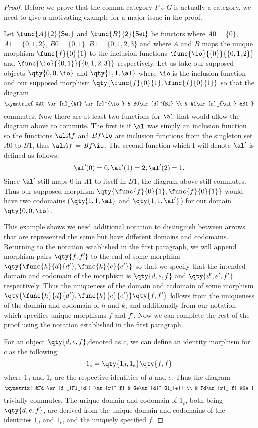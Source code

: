 \documentclass[../../main]{subfiles}
\begin{document}
\begin{proof}
	Before we prove that the comma category $F\downarrow G$ is actually a
	category, we need to give a motivating example for a major issue in the
	proof.

	Let \(\func{A}{\mathsf{2}}{\mathsf{Set}}\) and
	\(\func{B}{\mathsf{2}}{\mathsf{Set}}\) be functors where $A0 = \{0\}$, $A1 =
	\{0,1,2\}$, $B0 = \{0,1\}$, $B1 = \{0,1,2,3\}$ and where $A$ and $B$ maps
	the unique morphism \(\func{f}{0}{1}\) to the inclusion functions
	\(\func{\io}{\{0\}}{\{0,1,2\}}\)  and \(\func{\io}{\{0,1\}}{\{0,1,2,3\}}\)
	respectively. Let us take our supposed objects $\qty{0,0,\io}$  and
	$\qty{1,1,\al}$ where $\io$ is the inclusion function and our supposed
	morphism $\qty{\func{f}{0}{1},\func{f}{0}{1}}$ so that the diagram
	\[\xymatrix{ &A0 \ar[d]_{Af} \ar[r]^{\io} & B0\ar[d]^{Bf}  \\  &
	A1\ar[r]_{\al} &B1   } \] commutes. Now there are at least two functions for
	$\al$ that would allow the diagram above to commute. The first is if $\al$
	was simply an inclusion function so the functions $\al  Af$ and $Bf
	 \io$ are inclusion functions from the singleton set $A0$ to $B1$, thus
	$\al  Af$ =  $Bf  \io$. The second function which I will denote
	$\al'$ is defined as follows:\[ \al'(0) = 0, \al'(1) = 2,\al'(2) = 1.\]
	Since $\al'$ still maps $0$ in $A1$ to itself in $B1$, the diagram above
	still commutes. Thus our supposed morphism
	$\qty{\func{f}{0}{1},\func{f}{0}{1}}$ would have two codomains
	($\qty{1,1,\al}$ and $\qty{1,1,\al'}$) for our domain $\qty{0,0,\io}$.

	This example shows we need additional notation to distinguish between arrows
	that are represented the same but have different domains and codomains.
	Returning to the notation established in the first paragraph, we will append
	morphism pairs $\qty{f,f'}$ to the end of some morphism
	$\qty{\func{h}{d}{d'},\func{k}{e}{e'}}$ so that we specify that the intended
	domain and codomain of the morphism is $\qty{d,e,f}$ and $\qty{d',e',f'}$
	respectively. Thus the uniqueness of the domain and codomain of some
	morphism $\qty{\func{h}{d}{d'},\func{k}{e}{e'}} \qty{f,f'}$ follows from the
	uniqueness of the domain and codomain of $h$ and $k$, and additionally from
	our notation which specifies unique morphisms $f$ and $f'$. Now we can
	complete the rest of the proof using the notation established in the first
	paragraph.

	For an object $\qty{d,e,f}$,denoted as $c$, we can define an identity
	morphism for $c$ as the following:  \[ 1_c  = \qty{1_{d},1_{e}}\qty{f,f}\]
	where $1_{d}$ and $1_{e}$ are the respective identities of $d$ and $e$. Thus
	the diagram \[\xymatrix{ &Fd \ar[d]_{F1_{d}} \ar[r]^{f} & Ge\ar[d]^{G1_{e}}
						 \\  & Fd\ar[r]_{f} &Ge   } \] trivially commutes. The
		unique domain and codomain of $1_c$, both being $\qty{d,e,f}$, are
		derived from the unique domain and codomains of the identities $1_d$ and
		$1_e$, and the uniquely specified $f$.


\end{proof}
\end{document}
